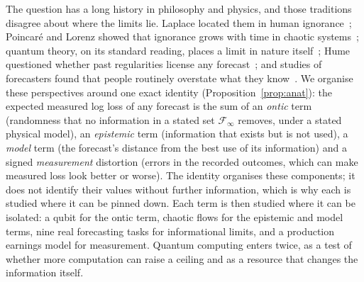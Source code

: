 \documentclass[journal]{IEEEtran}
\theoremstyle{definition}
\newcommand{\F}{\mathcal{F}}
\begin{document}
The question has a long history in philosophy and physics, and those traditions disagree about where the limits lie. Laplace located them in human ignorance~\cite{laplace1814essai}; Poincar\'e and Lorenz showed that ignorance grows with time in chaotic systems~\cite{poincare1908science,lorenz1963deterministic}; quantum theory, on its standard reading, places a limit in nature itself~\cite{bell1964einstein}; Hume questioned whether past regularities license any forecast~\cite{hume1748enquiry}; and studies of forecasters found that people routinely overstate what they know~\cite{kahneman1973psychology,meehl1954clinical,tetlock2015superforecasting}. We organise these perspectives around one exact identity (Proposition~\ref{prop:anat}): the expected measured log loss of any forecast is the sum of an \emph{ontic} term (randomness that no information in a stated set $\F_\infty$ removes, under a stated physical model), an \emph{epistemic} term (information that exists but is not used), a \emph{model} term (the forecast's distance from the best use of its information) and a signed \emph{measurement} distortion (errors in the recorded outcomes, which can make measured loss look better or worse). The identity organises these components; it does not identify their values without further information, which is why each is studied where it can be pinned down. Each term is then studied where it can be isolated: a qubit for the ontic term, chaotic flows for the epistemic and model terms, nine real forecasting tasks for informational limits, and a production earnings model for measurement. Quantum computing enters twice, as a test of whether more computation can raise a ceiling and as a resource that changes the information itself.
\end{document}
